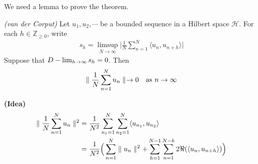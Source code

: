 \documentclass[10pt,a4paper]{report}
\newenvironment{proof}
{\begin{changemargin}{1cm}{0.5cm} 
	}%
	{\end{changemargin}
}
\begin{document}
We need a lemma to prove the theorem.
\s

\lem \emph{(van der Corput)} Let $u_1,u_2,\cdots$ be a bounded sequence in a Hilbert space $\mathscr{H}$. For each $h \in \mathbb{Z}_{\geq 0}$, write
\begin{align*}
s_h = \limsup_{N\rightarrow \infty} \Big| \frac{1}{N} \sum_{n=1}^N \langle u_n, u_{n+h} \rangle \Big|
\end{align*}
Suppose that $D-\lim_{h\rightarrow \infty} s_h =0$. Then
\begin{align*}
\parallel \frac{1}{N} \sum_{n=1}^N u_n \parallel_{} \rightarrow 0 \quad \text{as } n\rightarrow \infty
\end{align*}
\begin{proof}
\textbf{(Idea)}
\begin{align*}
\parallel \frac{1}{N}\sum_{n=1}^N u_n \parallel_{}^2 &= \frac{1}{N^2} \sum_{n_1=1}^N \sum_{n_2=1}^N \langle u_{n_1}, u_{n_2} \rangle \\
&= \frac{1}{N^2} \Big( \sum_{n=1}^N \parallel u_n \parallel_{}^2 + \sum_{h=1}^{N-1} \sum_{n=1}^{N-k} 2 \Re (\langle u_n, u_{n+h} \rangle ) \Big)
\end{align*}
\s


\end{proof}
\end{document}

